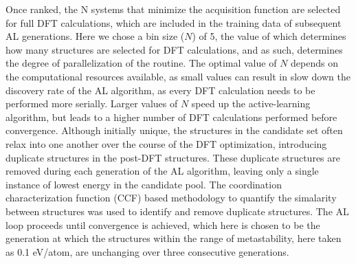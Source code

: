 Once ranked, the N systems that minimize the acquisition function are selected for full DFT calculations, which are included in the training data of subsequent AL generations.
%
Here we chose a bin size ($N$) of \num{5}, the value of which determines how many structures are selected for DFT calculations,
and as such, determines the degree of parallelization of the routine.
%
The optimal value of $N$ depends on the computational resources available, as small values can result in slow down the discovery rate of the AL algorithm,
as every DFT calculation needs to be performed more serially.
%
Larger values of $N$ speed up the active-learning algorithm, but leads to a higher number of DFT calculations performed before convergence.
%
Although initially unique, the structures in the candidate set often relax into one another over the course of the DFT optimization, introducing duplicate structures in the post-DFT structures.
%
These duplicate structures are removed during each generation of the AL algorithm, leaving only a single instance of lowest energy in the candidate pool.
%
The coordination characterization function (CCF) based methodology to quantify the simalarity between structures was used to identify and remove duplicate structures.\cite{Su2017}
%
The AL loop proceeds until convergence is achieved, which here is chosen to be the generation at which the structures within the range of metastability, here taken as \num{0.1} eV/atom, are unchanging over three consecutive generations.


